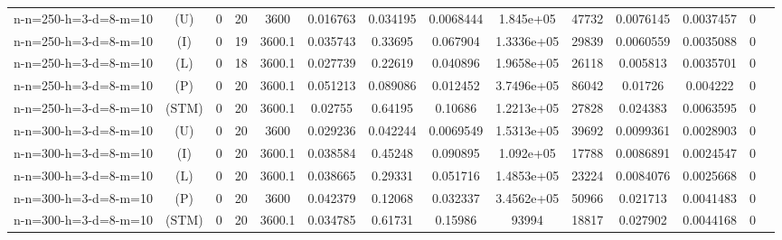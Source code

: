 \documentclass[landscape, a4paper]{article}
\newcommand{\STM}{\ensuremath{\mathrm{STM}}}
\newcommand{\Improved}{\ensuremath{\mathrm{I}}}
\newcommand{\Loose}{\ensuremath{\mathrm{L}}}
\newcommand{\Profit}{\ensuremath{\mathrm{P}}}
\newcommand{\Utility}{\ensuremath{\mathrm{U}}}
\begin{document}
\begin{center}
\begin{tabular}{lccccccccccccc}
n-n=250-h=3-d=8-m=10 & (\Utility) & 0 & 20 & 3600 & 0.016763 & 0.034195 & 0.0068444 & 1.845e+05 & 47732 & 0.0076145 & 0.0037457 & 0 & \\
n-n=250-h=3-d=8-m=10 & (\Improved) & 0 & 19 & 3600.1 & 0.035743 & 0.33695 & 0.067904 & 1.3336e+05 & 29839 & 0.0060559 & 0.0035088 & 0 & \\
n-n=250-h=3-d=8-m=10 & (\Loose) & 0 & 18 & 3600.1 & 0.027739 & 0.22619 & 0.040896 & 1.9658e+05 & 26118 & 0.005813 & 0.0035701 & 0 & \\
n-n=250-h=3-d=8-m=10 & (\Profit) & 0 & 20 & 3600.1 & 0.051213 & 0.089086 & 0.012452 & 3.7496e+05 & 86042 & 0.01726 & 0.004222 & 0 & \\
n-n=250-h=3-d=8-m=10 & (\STM) & 0 & 20 & 3600.1 & 0.02755 & 0.64195 & 0.10686 & 1.2213e+05 & 27828 & 0.024383 & 0.0063595 & 0 & \\
n-n=300-h=3-d=8-m=10 & (\Utility) & 0 & 20 & 3600 & 0.029236 & 0.042244 & 0.0069549 & 1.5313e+05 & 39692 & 0.0099361 & 0.0028903 & 0 & \\
n-n=300-h=3-d=8-m=10 & (\Improved) & 0 & 20 & 3600.1 & 0.038584 & 0.45248 & 0.090895 & 1.092e+05 & 17788 & 0.0086891 & 0.0024547 & 0 & \\
n-n=300-h=3-d=8-m=10 & (\Loose) & 0 & 20 & 3600.1 & 0.038665 & 0.29331 & 0.051716 & 1.4853e+05 & 23224 & 0.0084076 & 0.0025668 & 0 & \\
n-n=300-h=3-d=8-m=10 & (\Profit) & 0 & 20 & 3600 & 0.042379 & 0.12068 & 0.032337 & 3.4562e+05 & 50966 & 0.021713 & 0.0041483 & 0 & \\
n-n=300-h=3-d=8-m=10 & (\STM) & 0 & 20 & 3600.1 & 0.034785 & 0.61731 & 0.15986 & 93994 & 18817 & 0.027902 & 0.0044168 & 0 & \\
\end{tabular}
\end{center}

\newpage
\end{document}
